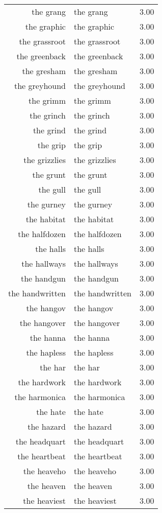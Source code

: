 \begin{table}[ht]
\begin{tabular}{rlr}
  the grang & the grang & 3.00 \\ 
  the graphic & the graphic & 3.00 \\ 
  the grassroot & the grassroot & 3.00 \\ 
  the greenback & the greenback & 3.00 \\ 
  the gresham & the gresham & 3.00 \\ 
  the greyhound & the greyhound & 3.00 \\ 
  the grimm & the grimm & 3.00 \\ 
  the grinch & the grinch & 3.00 \\ 
  the grind & the grind & 3.00 \\ 
  the grip & the grip & 3.00 \\ 
  the grizzlies & the grizzlies & 3.00 \\ 
  the grunt & the grunt & 3.00 \\ 
  the gull & the gull & 3.00 \\ 
  the gurney & the gurney & 3.00 \\ 
  the habitat & the habitat & 3.00 \\ 
  the halfdozen & the halfdozen & 3.00 \\ 
  the halls & the halls & 3.00 \\ 
  the hallways & the hallways & 3.00 \\ 
  the handgun & the handgun & 3.00 \\ 
  the handwritten & the handwritten & 3.00 \\ 
  the hangov & the hangov & 3.00 \\ 
  the hangover & the hangover & 3.00 \\ 
  the hanna & the hanna & 3.00 \\ 
  the hapless & the hapless & 3.00 \\ 
  the har & the har & 3.00 \\ 
  the hardwork & the hardwork & 3.00 \\ 
  the harmonica & the harmonica & 3.00 \\ 
  the hate & the hate & 3.00 \\ 
  the hazard & the hazard & 3.00 \\ 
  the headquart & the headquart & 3.00 \\ 
  the heartbeat & the heartbeat & 3.00 \\ 
  the heaveho & the heaveho & 3.00 \\ 
  the heaven & the heaven & 3.00 \\ 
  the heaviest & the heaviest & 3.00 \\ 

\end{tabular}
\end{table}
